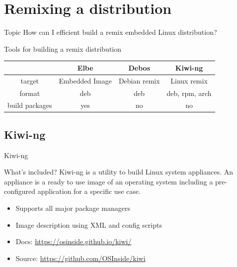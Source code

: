 \documentclass{beamer}
\begin{document}
\section{Remixing a distribution}

\begin{frame}
	\begin{block}{Topic}
		How can I efficient build a remix embedded Linux distribution?
	\end{block}
\end{frame}

\begin{frame}{Tools for building a remix distribution}
	\begin{tabular}{c|ccc}
		& \textbf{Elbe} & \textbf{Debos} & \textbf{Kiwi-ng} \\
		\hline
		target & Embedded Image & Debian remix & Linux remix \\ 
		format & deb & deb & deb, rpm, arch \\
		build packages & yes & no & no \\
	\end{tabular}
\end{frame}

\subsection{Kiwi-ng}

\begin{frame}{Kiwi-ng}
	\begin{block}{What's included?} 
		Kiwi-ng is a utility to build Linux system appliances. 
		An appliance is a ready to use image of an operating system including a pre-configured application for a specific use case. 
	\end{block}

	\begin{itemize}
		\item Supports all major package managers
		\item Image description using XML and config scripts
		\item Docs: \url{https://osinside.github.io/kiwi/}
		\item Source: \url{https://github.com/OSInside/kiwi}
	\end{itemize}
\end{frame}
\end{document}
